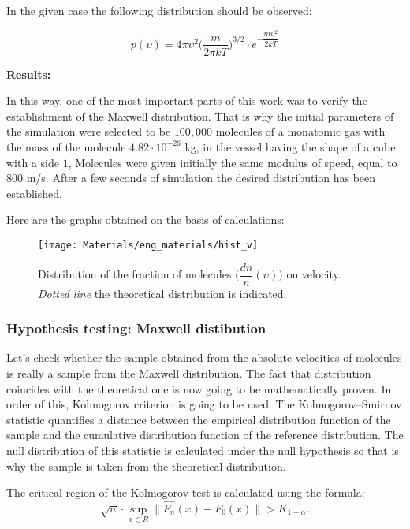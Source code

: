 \documentclass[12pt,twoside]{article}
\begin{document}
    In the given case the following distribution should be observed:

      \begin{equation}
        p(\upsilon) = 4\pi\upsilon^2 \Big( \dfrac{m}{2\pi kT} \Big)^{3/2}\cdot e^{-\dfrac{m \upsilon^2}{2kT}}
    \end{equation}

    \textbf{Results: }

    \indent In this way, one of the most important parts of this work was to verify the establishment of the Maxwell distribution.
    That is why the initial parameters of the simulation were selected to be $100,000$ molecules of a monatomic gas with the mass of the molecule $4.82 \cdot 10^{-26}$ kg,
    in the vessel having the shape of a cube with a side $1$,
    Molecules were given initially the same modulus of speed, equal to $800$ m/s.
    After a few seconds of simulation the desired distribution has been established.

    Here are the graphs obtained on the basis of calculations:

    \begin{figure}[H]
        \centering
        {\texttt{[image: Materials/eng\_materials/hist\_v]}}
        \caption{Distribution of the fraction of molecules $\Big(\dfrac{dn}{n} (\upsilon) \Big)$ on velocity. \textit{Dotted line} the theoretical distribution is indicated. }
    \end{figure}

    \subsubsection{Hypothesis testing: Maxwell distibution}

    Let's check whether the sample obtained from the absolute velocities of molecules is really a sample from the Maxwell distribution.
    The fact that distribution coincides with the theoretical one is now going to be mathematically proven. In order of this, Kolmogorov criterion \cite{kolmogorov1933sulla} is going to be used.
    The Kolmogorov–Smirnov statistic quantifies a distance between the empirical distribution function of the sample and the cumulative distribution function of the reference distribution.
    The null distribution of this statistic is calculated under the null hypothesis so that is why the sample is taken from the theoretical distribution.

    The critical region of the Kolmogorov test is calculated using the formula:
    \begin{equation}
        \sqrt{n} \cdot \sup\limits_{x \in R} \| \hat{F_n}(x)- F_0(x) \| > K_{1-\alpha}.
    \end{equation}
\end{document}
